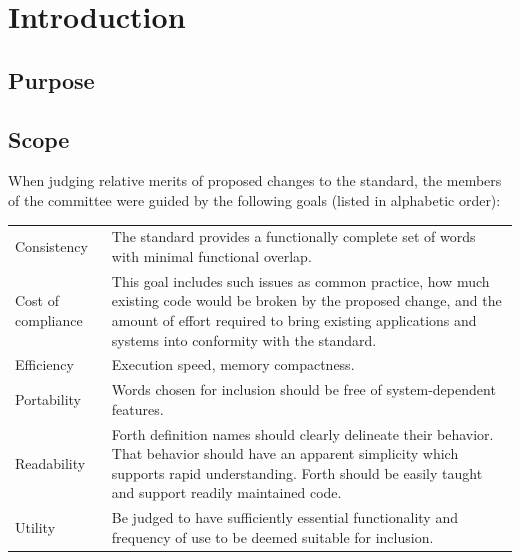 
\label{annex:rationale}

\ifinline\else
\fi

\newcommand{\readrationale}[1]{%
	\ifinline
		\begin{editor}
			In the \emph{review} (r) version of the document the
			rationale text for each of the words is given in with
			the main definition of the word.  The rationale for
			words in the \textbf{#1} word set will appear here in
			the final document.
		\end{editor}
	\else
		\defersection{}
		
		\stepsection
	\fi
}

\section{Introduction} %

\subsection{Purpose} %

\subsection{Scope} %
\label{rat:scope}

When judging relative merits of proposed changes to the standard, the
members of the committee were guided by the following goals (listed
in alphabetic order):

\begin{tabular}{lp{}}
Consistency	&
	The standard provides a functionally complete set of words with
	minimal functional overlap.
	\\[\parskip]
Cost of compliance &
	This goal includes such issues as common practice, how much
	existing code would be broken by the proposed change, and the
	amount of effort required to bring existing applications and
	systems into conformity with the standard.
	\\[\parskip]
Efficiency &
	Execution speed, memory compactness.
	\\[\parskip]
Portability	&
	Words chosen for inclusion should be free of system-dependent
	features.
	\\[\parskip]
Readability &
	Forth definition names should clearly delineate their behavior.
	That behavior should have an apparent simplicity which supports
	rapid understanding. Forth should be easily taught and support
	readily maintained code.
	\\[\parskip]
Utility	&
	Be judged to have sufficiently essential functionality and
	frequency of use to be deemed suitable for inclusion.
\end{tabular}


